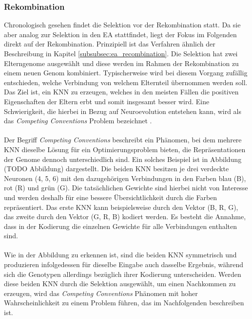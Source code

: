 \subsubsection{Rekombination}
\label{subsubsec:recombination}
Chronologisch gesehen findet die Selektion vor der Rekombination statt. Da sie aber analog zur Selektion in den \ac{EA} stattfindet, liegt der Fokus im Folgenden direkt auf der Rekombination. Prinzipiell ist das Verfahren ähnlich der Beschreibung in Kapitel \ref{subsubsec:ea_recombination}. Die Selektion hat zwei Elterngenome ausgewählt und diese werden im Rahmen der Rekombination zu einem neuen Genom kombiniert. Typischerweise wird bei diesem Vorgang zufällig entschieden, welche Verbindung von welchem Elternteil übernommen werden soll. Das Ziel ist, ein \ac{KNN} zu erzeugen, welches in den meisten Fällen die positiven Eigenschaften der Eltern erbt und somit insgesamt besser wird. Eine Schwierigkeit, die hierbei in Bezug auf Neuroevolution entstehen kann, wird als das \emph{Competing Conventions} Problem bezeichnet \cite{stanley2002evolving}.
\\\\ %
Der Begriff \emph{Competing Conventions} beschreibt ein Phänomen, bei dem mehrere \ac{KNN} dieselbe Lösung für ein Optimierungsproblem bieten, die Repräsentationen der Genome dennoch unterschiedlich sind. Ein solches Beispiel ist in Abbildung (TODO Abbildung) dargestellt. Die beiden \ac{KNN} besitzen je drei verdeckte Neuronen (4, 5, 6) mit den dazugehörigen Verbindungen in den Farben blau (B), rot (R) und grün (G). Die tatsächlichen Gewichte sind hierbei nicht von Interesse und werden deshalb für eine bessere Übersichtlichkeit durch die Farben repräsentiert. Das erste \ac{KNN} kann beispielsweise durch den Vektor (B, R, G), das zweite durch den Vektor  (G, R, B) kodiert werden. Es besteht die Annahme, dass in der Kodierung die einzelnen Gewichte für alle Verbindungen enthalten sind. \\\\
Wie in der Abbildung zu erkennen ist, sind die beiden \ac{KNN} symmetrisch und produzieren infolgedessen für dieselbe Eingabe auch dasselbe Ergebnis, während sich die Genotypen allerdings bezüglich ihrer Kodierung unterscheiden. Werden diese beiden \ac{KNN} durch die Selektion ausgewählt, um einen Nachkommen zu erzeugen, wird das \emph{Competing Conventions} Phänomen mit hoher Wahrscheinlichkeit zu einem Problem führen, das im Nachfolgenden beschreiben ist. 
\\\\
